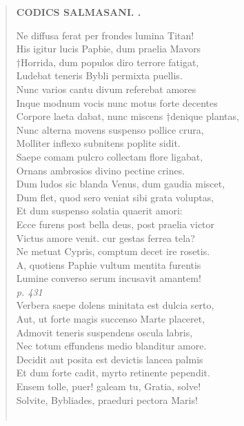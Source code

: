 \documentclass[11pt, a4paper]{report}
\begin{document}
\begin{verse}
    \begin{center} \textbf{CODICS SALMASANI. .} \end{center} \marginpar{[205]} Ne diffusa ferat per frondes lumina Titan! \\ His igitur lucis Papbie, dum praelia Mavors \\ †Horrida, dum populos diro terrore fatigat, \\ Ludebat teneris Bybli permixta puellis. \\ Nunc varios cantu divum referebat amores \\ Inque modnum vocis nunc motus forte decentes \\ Corpore laeta dabat, nunc miscens †denique plantas, \\ Nunc alterna movens suspenso pollice crura, \\ Molliter inflexo subnitens poplite sidit. \\ Saepe comam pulcro collectam flore ligabat, \\ Ornans ambrosios divino pectine crines. \\ Dum ludos sic blanda Venus, dum gaudia miscet, \\  Dum flet, quod sero veniat sibi grata voluptas, \\ Et dum suspenso solatia quaerit amori: \\ Ecce furens post bella deus, post praelia victor \\ Victus amore venit. cur gestas ferrea tela? \\ Ne metuat Cypris, comptum decet ire rosetis. \\ A, quotiens Paphie vultum mentita furentis \\ Lumine converso serum incusavit amantem! \\ \textit{p. 431} \\ Verbera saepe dolens minitata est dulcia serto, \\ Aut, ut forte magis succenso Marte placeret, \\ Admovit teneris suspendens oscula labris, \\ Nec totum effundens medio blanditur amore. \\ Decidit aut posita est devictis lancea palmis \\ Et dum forte cadit, myrto retinente pependit. \\ Ensem tolle, puer! galeam tu, Gratia, solve! \\ Solvite, Bybliades, praeduri pectora Maris! \\ 
        ﻿\pagebreak 

\end{verse}
\end{document}
